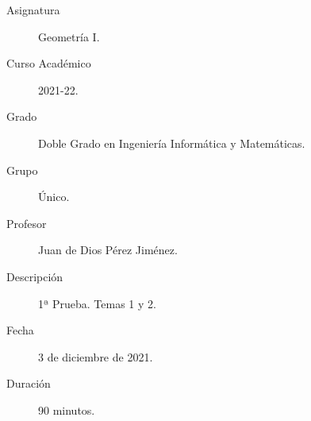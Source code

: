 \documentclass[12pt]{article}
\begin{document}

    
    

    \begin{description}
        \item[Asignatura] Geometría I.
        \item[Curso Académico] 2021-22.
        \item[Grado] Doble Grado en Ingeniería Informática y Matemáticas.
        \item[Grupo] Único.
        \item[Profesor] Juan de Dios Pérez Jiménez.
        \item[Descripción] 1ª Prueba. Temas 1 y 2.
        \item[Fecha] 3 de diciembre de 2021.
        \item[Duración] 90 minutos.
    
    \end{description}
    \newpage
    
\end{document}
